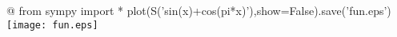 @{{{
from sympy import *
plot(S('sin(x)+cos(pi*x)'),show=False).save('fun.eps')
}}}
\texttt{[image: fun.eps]}